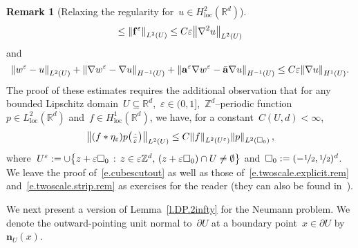 \documentclass[11pt,twoside]{article} %
\let\oldsquare\square %
\renewcommand{\square}{\oldsquare}
\numberwithin{equation}{section}
\theoremstyle{definition}
\newtheorem{remark}[theorem]{Remark}
\let\originalleft\left
\let\originalright\right
\renewcommand{\left}{\mathopen{}\mathclose\bgroup\originalleft}
\renewcommand{\right}{\aftergroup\egroup\originalright}
\newcommand*{\Zd}{\ensuremath{\mathbb{Z}^d}}
\newcommand*{\Rd}{\ensuremath{\mathbb{R}^d}}
\newcommand{\eps}{\varepsilon}
\newcommand{\f}{\mathbf{f}}
\newcommand{\ep}{\eps}
\renewcommand{\a}{\mathbf{a}}
\newcommand{\ahom}{\bar{\a}}
\newcommand{\cu}{\square}
\begin{document}
\begin{remark}[{Relaxing the regularity for~$u\in H^2_{\mathrm{loc}}(\Rd)$}]
\begin{equation}
\leq 
\left\| \f^\ep \right\|_{L^2(U)}
\leq
C \ep \left\| \nabla^2 u \right\|_{L^2(U)}
\end{equation}
and
\begin{equation}
\label{e.twoscale.strip.rem}
\left\| 
w^\ep - u 
\right\|_{L^2(U)} 
+
\left\| 
\nabla w^\ep - \nabla u \right\|_{H^{-1}(U)} 
+
\left\| 
\a^\ep \nabla w^\ep - \ahom \nabla u \right\|_{H^{-1}(U)}
\leq 
C \ep \left\| \nabla u \right\|_{H^1(U)}.
\end{equation}
The proof of these estimates requires the additional observation that for any bounded Lipschitz domain~$U\subseteq\Rd$,~$\ep\in(0,1]$,~$\Zd$--periodic function~$p \in L^2_{\mathrm{loc}}(\Rd)$ and~$f\in H^1_{\mathrm{loc}}(\Rd)$, we have, for a constant~$C(U,d)<\infty$,
\begin{align}
\label{e.cubescutout}
\left\| (f\ast \eta_\ep) p\bigl(\tfrac\cdot\ep\bigr)\right\|_{L^2(U)}
\leq
C \left\| f \right\|_{L^2(U^\ep)}
\left\| p \right\|_{L^2(\cu_0)}\,,
\end{align}
where~$U^\ep := \cup \left\{ z+\ep \cu_0 \, :\, z\in \ep\Zd, \, (z+\ep \cu_0) \cap U \neq \emptyset \right\}$
and~$\cu_0 := (-\nicefrac12, \nicefrac12)^d$.  
We leave the proof of~\eqref{e.cubescutout} as well as those of~\eqref{e.twoscale.explicit.rem} and~\eqref{e.twoscale.strip.rem} as exercises for the reader (they can also be found in~\cite[Chapter 6]{AKMBook}). 
\end{remark}


We next present a version of Lemma~\ref{l.DP.2infty} for the Neumann problem. 
We denote the outward-pointing unit normal to~$\partial U$ at a boundary point~$x\in\partial U$ by~$\mathbf{n}_{U}(x)$. 
\end{document}
